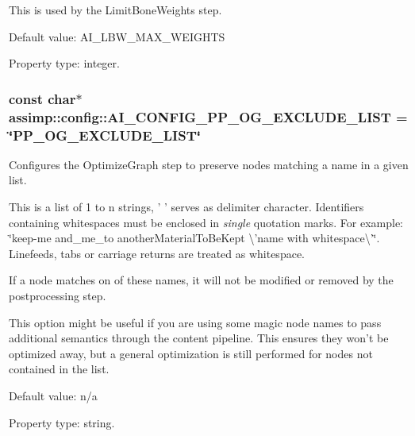 This is used by the {\ttfamily Limit\+Bone\+Weights} step.

Default value\+: A\+I\+\_\+\+L\+B\+W\+\_\+\+M\+A\+X\+\_\+\+W\+E\+I\+G\+H\+T\+S

Property type\+: integer. \hypertarget{namespaceassimp_1_1config_a6d97e821d31bab71a6f4bae280a127a2}{
\subsubsection[{A\+I\+\_\+\+C\+O\+N\+F\+I\+G\+\_\+\+P\+P\+\_\+\+O\+G\+\_\+\+E\+X\+C\+L\+U\+D\+E\+\_\+\+L\+I\+S\+T}]{\setlength{\rightskip}{0pt plus 5cm}const char$\ast$ assimp\+::config\+::\+A\+I\+\_\+\+C\+O\+N\+F\+I\+G\+\_\+\+P\+P\+\_\+\+O\+G\+\_\+\+E\+X\+C\+L\+U\+D\+E\+\_\+\+L\+I\+S\+T = \char`\"{}P\+P\+\_\+\+O\+G\+\_\+\+E\+X\+C\+L\+U\+D\+E\+\_\+\+L\+I\+S\+T\char`\"{}}}\label{namespaceassimp_1_1config_a6d97e821d31bab71a6f4bae280a127a2}
Configures the {\ttfamily Optimize\+Graph} step to preserve nodes matching a name in a given list.

This is a list of 1 to n strings, ' ' serves as delimiter character. Identifiers containing whitespaces must be enclosed in {\itshape single} quotation marks. For example\+: {\ttfamily  \char`\"{}keep-\/me and\+\_\+me\+\_\+to another\+Material\+To\+Be\+Kept \textbackslash{}'name with whitespace\textbackslash{}'\char`\"{}}. Linefeeds, tabs or carriage returns are treated as whitespace.

If a node matches on of these names, it will not be modified or removed by the postprocessing step.

This option might be useful if you are using some magic node names to pass additional semantics through the content pipeline. This ensures they won't be optimized away, but a general optimization is still performed for nodes not contained in the list.

Default value\+: n/a

Property type\+: string.

